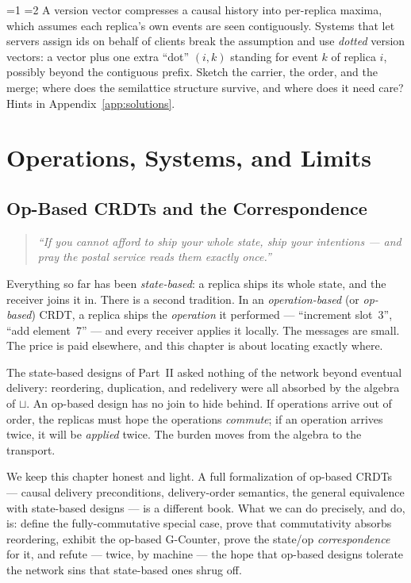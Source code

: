 \documentclass[12pt, a4paper, openright]{book}
\theoremstyle{thmstyle}
\theoremstyle{defstyle}
\newcounter{exercise}[chapter]
\renewcommand{\theexercise}{\thechapter.\arabic{exercise}}
\newenvironment{exercisebox}[1][]{%
  \refstepcounter{exercise}%
  \begin{tcolorbox}[exercisebox,
    title={Exercise \theexercise\ifx\\#1\\\else\ --- #1\fi}]%
}{\end{tcolorbox}}
\newcommand{\Stars}[1]{%
  \ifnum#1=1 \ding{72}\else\ifnum#1=2 \ding{72}\ding{72}\else
  \ding{72}\ding{72}\ding{72}\fi\fi\enspace}
\begin{document}
\begin{exercisebox}[Dotted version vectors]
  \label{ex:dotted-vv}
  \Stars{3}
  A version vector compresses a causal history into per-replica maxima,
  which assumes each replica's own events are seen contiguously. Systems
  that let servers assign ids on behalf of clients break the assumption
  and use \emph{dotted} version vectors: a vector plus one extra ``dot''
  $(i, k)$ standing for event $k$ of replica $i$, possibly beyond the
  contiguous prefix. Sketch the carrier, the order, and the merge; where
  does the semilattice structure survive, and where does it need care?
  Hints in Appendix~\ref{app:solutions}.
\end{exercisebox}
\part{Operations, Systems, and Limits}

\chapter{Op-Based CRDTs and the Correspondence}
\label{ch:opbased}

\begin{quote}
  \itshape
  ``If you cannot afford to ship your whole state, ship your
  intentions --- and pray the postal service reads them exactly once.''
\end{quote}

Everything so far has been \emph{state-based}: a replica ships its whole
state, and the receiver joins it in. There is a second tradition. In an
\emph{operation-based} (or \emph{op-based}) CRDT, a replica ships the
\emph{operation} it performed --- ``increment slot~3'', ``add element~7''
--- and every receiver applies it locally. The messages are small. The
price is paid elsewhere, and this chapter is about locating exactly where.

The state-based designs of Part~II asked nothing of the network beyond
eventual delivery: reordering, duplication, and redelivery were all
absorbed by the algebra of $\sqcup$. An op-based design has no join to
hide behind. If operations arrive out of order, the replicas must hope
the operations \emph{commute}; if an operation arrives twice, it will be
\emph{applied} twice. The burden moves from the algebra to the transport.

We keep this chapter honest and light. A full formalization of op-based
CRDTs --- causal delivery preconditions, delivery-order semantics,
the general equivalence with state-based designs --- is a different book.
What we can do precisely, and do, is: define the fully-commutative
special case, prove that commutativity absorbs reordering, exhibit the
op-based G-Counter, prove the state/op \emph{correspondence} for it, and
refute --- twice, by machine --- the hope that op-based designs tolerate
the network sins that state-based ones shrug off.
\end{document}
